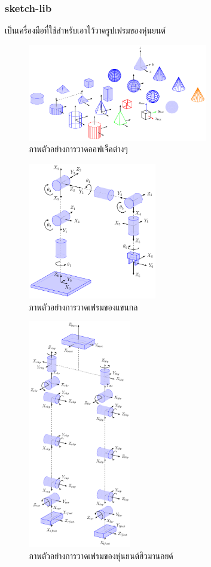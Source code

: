 \subsubsection*{sketch-lib}
เป็นเครื่องมือที่ใช้สำหรับเอาไว้วาดรูปเฟรมของหุ่นยนต์

\begin{figure}[ht]
	\centering
	\includegraphics[width=0.7\textwidth]{chapter3/images/basic-shapes.png}
	\caption{ภาพตัวอย่างการวาดออฟเจ็คต่างๆ}
	\label{fig:basic-shapes_sk}
\end{figure}
\begin{figure}[ht]
	\centering
	\includegraphics[width=0.5\textwidth]{chapter3/images/test_robot.png}
	\caption{ภาพตัวอย่างการวาดเฟรมของแขนกล}
	\label{fig:test-robot_sk}
\end{figure}
\begin{figure}[ht]
	\centering
	\includegraphics[width=0.4\textwidth]{chapter3/images/uthai_kinematics.png}
	\caption{ภาพตัวอย่างการวาดเฟรมของหุ่นยนต์ฮิวมานอยด์}
	\label{fig:uthai_kinematics_sk}
\end{figure}